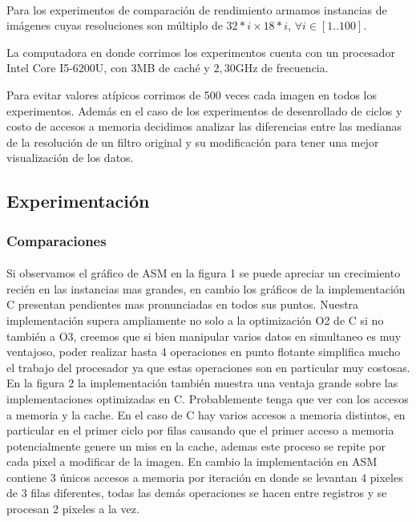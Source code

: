 \documentclass[a4paper]{article}
\begin{document}
\paragraph{} Para los experimentos de comparaci\'on de rendimiento armamos instancias de imágenes cuyas resoluciones son múltiplo de $32*i \times 18*i$, $\forall i \in [1..100]$.


La computadora en donde corrimos los experimentos cuenta con un procesador Intel Core I5-6200U, con 3MB de cach\'e y $2,30$GHz de frecuencia.


Para evitar valores at\'ipicos corrimos de 500 veces cada imagen en todos los experimentos. Adem\'as en el caso de los experimentos de desenrollado de ciclos y costo de accesos a memoria decidimos analizar las diferencias entre las medianas de la resoluci\'on de un filtro original y su modificaci\'on para tener una mejor visualizaci\'on de los datos.

\subsection{Experimentaci\'on}

\subsubsection{Comparaciones}

\paragraph{} Si observamos el gr\'afico de ASM en la figura 1 se puede apreciar un crecimiento recién en las instancias mas grandes, en cambio los gr\'aficos de la implementaci\'on C presentan pendientes mas pronunciadas en todos sus puntos. Nuestra implementaci\'on supera ampliamente no solo a la optimizaci\'on O2 de C si no también a O3, creemos que si bien manipular varios datos en simultaneo es muy ventajoso, poder realizar hasta 4 operaciones en punto flotante simplifica mucho el trabajo del procesador ya que estas operaciones son en particular muy costosas.\\
 
 En la figura 2 la implementaci\'on también muestra una ventaja grande sobre las implementaciones optimizadas en C. Probablemente tenga que ver con los accesos a memoria y la cache. En el caso de C hay varios accesos a memoria distintos, en particular en el primer ciclo por filas causando que el primer acceso a memoria potencialmente genere un miss en la cache, ademas este proceso se repite por cada pixel a modificar de la imagen. En cambio la implementaci\'on en ASM contiene 3 \'unicos accesos a memoria por iteraci\'on en donde se levantan 4 pixeles de 3 filas diferentes, todas las dem\'as operaciones se hacen entre registros y se procesan 2 pixeles a la vez.  \\
\end{document}
